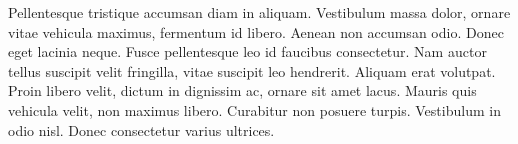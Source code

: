 \label{sec:evaluation}
Pellentesque tristique accumsan diam in aliquam. Vestibulum massa dolor, ornare vitae vehicula maximus, fermentum id libero. Aenean non accumsan odio. Donec eget lacinia neque. Fusce pellentesque leo id faucibus consectetur. Nam auctor tellus suscipit velit fringilla, vitae suscipit leo hendrerit. Aliquam erat volutpat. Proin libero velit, dictum in dignissim ac, ornare sit amet lacus. Mauris quis vehicula velit, non maximus libero. Curabitur non posuere turpis. Vestibulum in odio nisl. Donec consectetur varius ultrices.